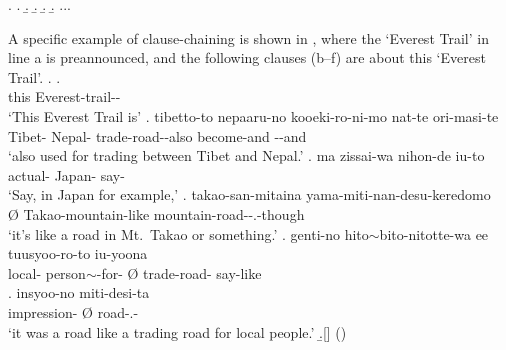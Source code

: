 %
\ex.
 \a. 
 \b. 
 \b. 
 \b. 
 \b. ...

A specific example of clause-chaining is shown in \Next,
where the  `Everest Trail' in line a is preannounced,
and the following clauses (b--f) are about this  `Everest Trail'.
%
\ex.
\ag.   \\
	this Everest-trail-- \\
	`{This Everest Trail} is'
\bg. tibetto-to nepaaru-no kooeki-ro-ni-mo nat-te ori-masi-te \\
	Tibet- Nepal- trade-road--also become-and --and \\
	`also used for trading  between Tibet and Nepal.'
\cg. ma zissai-wa nihon-de iu-to \tp{\dvline} \\
	 actual- Japan- say- \\
	`Say, in Japan for example,'
\dg. \EM{\O} takao-san-mitaina yama-miti-nan-desu-keredomo \\
	{\O} Takao-mountain-like mountain-road--.-though \\
	`it's like a road in Mt.\ Takao or something.'
\eg. genti-no hito$\sim$bito-nitotte-wa ee \EM{\O} tuusyoo-ro-to iu-yoona \\
	local- person$\sim$-for-  {\O} trade-road- say-like \\
\bg. insyoo-no \EM{\O} miti-desi-ta \\
	 impression- {\O} road-.- \\
 `{it} was a road like a trading road for local people.'
 \b.[] \hfill{()}


